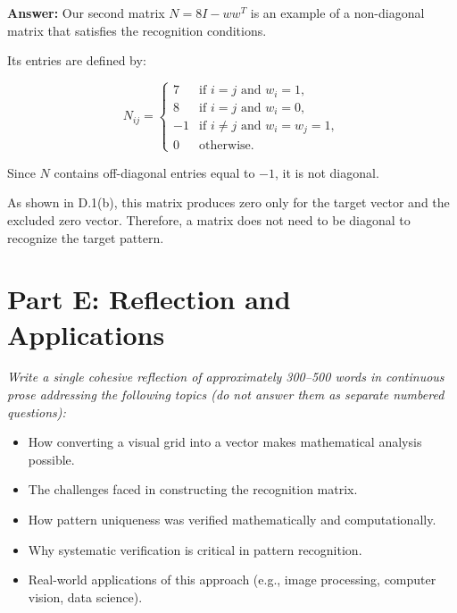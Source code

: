 \documentclass[11pt]{article}
\begin{document}
\vspace{0.4em}
\textbf{Answer:} 
Our second matrix $N = 8I - ww^T$ is an example
of a non-diagonal matrix that satisfies the
recognition conditions.

Its entries are defined by:

\[
N_{ij} =
\begin{cases}
7 & \text{if } i=j \text{ and } w_i=1,\\
8 & \text{if } i=j \text{ and } w_i=0,\\
-1 & \text{if } i\neq j \text{ and } w_i=w_j=1,\\
0 & \text{otherwise}.
\end{cases}
\]

Since $N$ contains off-diagonal entries equal
to $-1$, it is not diagonal.

As shown in D.1(b), this matrix produces zero
only for the target vector and the excluded
zero vector. Therefore, a matrix does not need
to be diagonal to recognize the target pattern.

\newpage

\section*{Part E: Reflection and Applications}

\textit{Write a single cohesive reflection of approximately 300--500 words in continuous prose addressing the following topics (do not answer them as separate numbered questions):}
\begin{itemize}
    \item How converting a visual grid into a vector makes mathematical analysis possible.
    \item The challenges faced in constructing the recognition matrix.
    \item How pattern uniqueness was verified mathematically and computationally.
    \item Why systematic verification is critical in pattern recognition.
    \item Real-world applications of this approach (e.g., image processing, computer vision, data science).
\end{itemize}

\vspace{0.8em}
\end{document}
